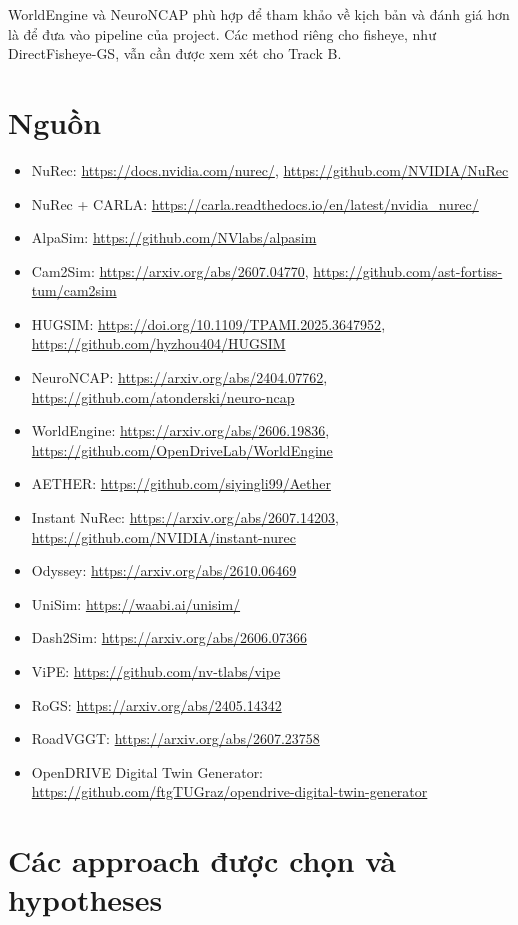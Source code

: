 WorldEngine và NeuroNCAP phù hợp để tham khảo về kịch bản và đánh giá hơn là để đưa vào pipeline của project.
Các method riêng cho fisheye, như DirectFisheye-GS, vẫn cần được xem xét cho Track B.

\section{Nguồn}

{\raggedright
\begin{itemize}
  \item NuRec: \url{https://docs.nvidia.com/nurec/}, \url{https://github.com/NVIDIA/NuRec}
  \item NuRec + CARLA: \url{https://carla.readthedocs.io/en/latest/nvidia_nurec/}
  \item AlpaSim: \url{https://github.com/NVlabs/alpasim}
  \item Cam2Sim: \url{https://arxiv.org/abs/2607.04770}, \url{https://github.com/ast-fortiss-tum/cam2sim}
  \item HUGSIM: \url{https://doi.org/10.1109/TPAMI.2025.3647952}, \url{https://github.com/hyzhou404/HUGSIM}
  \item NeuroNCAP: \url{https://arxiv.org/abs/2404.07762}, \url{https://github.com/atonderski/neuro-ncap}
  \item WorldEngine: \url{https://arxiv.org/abs/2606.19836}, \url{https://github.com/OpenDriveLab/WorldEngine}
  \item AETHER: \url{https://github.com/siyingli99/Aether}
  \item Instant NuRec: \url{https://arxiv.org/abs/2607.14203}, \url{https://github.com/NVIDIA/instant-nurec}
  \item Odyssey: \url{https://arxiv.org/abs/2610.06469}
  \item UniSim: \url{https://waabi.ai/unisim/}
  \item Dash2Sim: \url{https://arxiv.org/abs/2606.07366}
  \item ViPE: \url{https://github.com/nv-tlabs/vipe}
  \item RoGS: \url{https://arxiv.org/abs/2405.14342}
  \item RoadVGGT: \url{https://arxiv.org/abs/2607.23758}
  \item OpenDRIVE Digital Twin Generator: \url{https://github.com/ftgTUGraz/opendrive-digital-twin-generator}
\end{itemize}
}

\section{Các approach được chọn và hypotheses}


